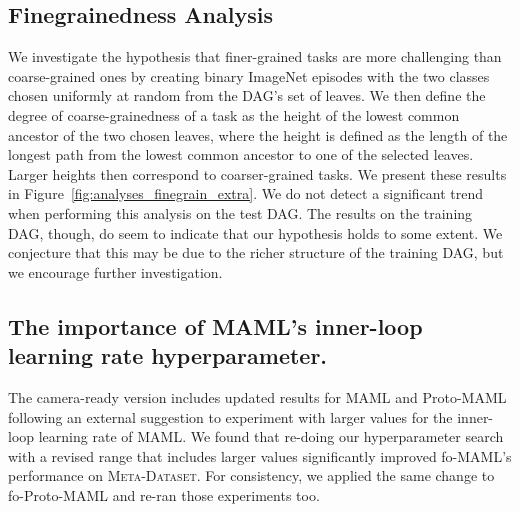 \documentclass{article} \usepackage{iclr2020_conference,times}
\newcommand{\benchmark}{\textsc{Meta-Dataset}\xspace}
\begin{document}
\subsection{Finegrainedness Analysis}
\begin{figure*}[htp]
   \centering
{}\hspace{0.01cm}
\hspace{0.01cm}
   \caption{\label{fig:analyses_finegrain_extra} Analysis of performance as a function of the degree of fine-grainedness. Larger heights correspond to coarser-grained tasks. The bands display 95\% confidence intervals.}
 \end{figure*}

We investigate the hypothesis that finer-grained tasks are more challenging than coarse-grained ones by creating binary ImageNet episodes with the two classes chosen uniformly at random from the DAG's set of leaves. We then define the degree of coarse-grainedness of a
task as the height of the lowest common ancestor of the two chosen leaves,
where the height is defined as the length of the longest path from the lowest
common ancestor to one of the selected leaves. Larger heights then correspond
to coarser-grained tasks. We present these results in Figure~\ref{fig:analyses_finegrain_extra}. We do not detect a significant trend when
performing this analysis on the test DAG. The results on the training DAG, though, do seem to indicate that our
hypothesis holds to some extent. We conjecture that this may be due to the
richer structure of the training DAG, but we encourage further investigation.

\subsection{The importance of MAML's inner-loop learning rate hyperparameter.}
The camera-ready version includes updated results for MAML and Proto-MAML
following an external suggestion to experiment with larger values for the
inner-loop learning rate  of MAML. We found that re-doing our
hyperparameter search with a revised range that includes larger  values
significantly improved fo-MAML's performance on \benchmark. For consistency, we
applied the same change to fo-Proto-MAML and re-ran those experiments too.
\end{document}
